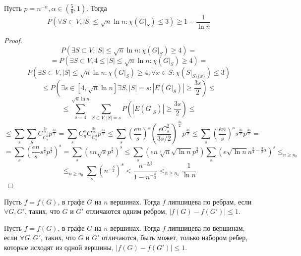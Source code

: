 
\begin{lemma}
    Пусть \(p = n^{-\alpha}, \alpha \in \left( \frac{5}{6}, 1 \right)\). Тогда
    \[P\left(\forall S \subset V, |S| \le \sqrt{n}\ln n: \chi\left( G|_S \right)\le 3 \right) \ge 1 - \frac{1}{\ln n}\]
\end{lemma}
\begin{proof}
    \[P\left( \exists S \subset V, |S| \le \sqrt{n}\ln n: \chi\left( G|_S \right) \ge 4\right) = \]
    \[ = P\left( \exists S \subset V, 4 \le |S| \le \sqrt{n}\ln n: \chi\left( G|_S \right) \ge 4\right) = \]
    \[P\left( \exists S \subset V, |S| \le \sqrt{n}\ln n: \chi\left( G|_S \right) \ge 4, \forall x \in S: \chi\left( S|_{S\setminus \{x\}} \right) \le 3\right)\]
    \[\le P\left( \exists s \in [4, \sqrt{n}\ln n] \exists S, |S| = s : \left| E\left( G|_S \right) \right| \ge \frac{3s}{2} \right) \le\]
    \[\le \sum_{s = 4}^{\sqrt{n}\ln n}\sum_{S \subset V, |S| = s} P\left( \left| E\left( G|_S \right) \right| \ge \frac{3s}{2} \right) \le \]
    \[ \le \sum_{s}\sum_S C_{C_s^2}^{\frac{3s}{2}}p^{\frac{3s}{2}} = \sum_sC_n^sC_{C_s^2}^{\frac{3s}{2}}p^{\frac{3s}{2}} \le \sum_s\left( \frac{en}{s} \right)^s\left( \frac{eC_s^2}{3s/2} \right)^{\frac{3s}{2}}p^{\frac{3s}{2}} \le\sum_s \left( \frac{en}{s} \right)^s s^{\frac{3s}{2}}p^{\frac{3s}{2}} = \]
    \[ = \sum_s \left( \frac{en}{s}s^{\frac{3}{2}}p^{\frac{3}{2}} \right)^s = \sum_s\left( en\sqrt{s}p^{\frac{3}{2}} \right)^s \le \sum_s (en\sqrt[4]{n}\sqrt{\ln n}p^{\frac{3}{2}}) \sum_s \left( e\sqrt{\ln n}n^{\frac{5}{4} - \frac{3}{2}\alpha} \right)^s \le_{n \ge n_0}\]
    \[\le_{n \ge n_0} \sum_s\left( n^{-\frac{\beta}{2}} \right)^s < \frac{n^{-2\beta}}{1 - n^{-\frac{\beta}{2}}} <_{n \ge n_1} \frac{1}{\ln n}\]
\end{proof}

\begin{definition}
    Пусть \(f = f(G)\), в графе \(G\) на \(n\) вершинах. Тогда \(f\) липшицева по ребрам, если \(\forall G, G'\), таких, что \(G\) и \(G'\) отличаются одним ребром, \(|f(G) - f(G')| \le 1\).
\end{definition}

\begin{definition}
    Пусть \(f = f(G)\), в графе \(G\) на \(n\) вершинах. Тогда \(f\) липшицева по вершинам, если \(\forall G, G'\), таких, что \(G\) и \(G'\) отличаются, быть может, только набором ребер, которые исходят из одной вершины, \(|f(G) - f(G')| \le 1\).
\end{definition}


